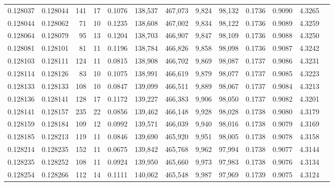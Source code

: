 \begin{tabular}{rrrrrrrrrrrrr}
0.128037 & 0.128044 &   141 &  17 &                                     0.1076 & 138,537 & 467,073 &   9,824 &  98,132 & 0.1736 & 0.9090 & 4.3265 \\
0.128044 & 0.128062 &    71 &  10 &                                     0.1235 & 138,608 & 467,002 &   9,834 &  98,122 & 0.1736 & 0.9089 & 4.3259 \\
0.128064 & 0.128079 &    95 &  13 &                                     0.1204 & 138,703 & 466,907 &   9,847 &  98,109 & 0.1736 & 0.9088 & 4.3250 \\
0.128081 & 0.128101 &    81 &  11 &                                     0.1196 & 138,784 & 466,826 &   9,858 &  98,098 & 0.1736 & 0.9087 & 4.3242 \\
0.128103 & 0.128111 &   124 &  11 &                                     0.0815 & 138,908 & 466,702 &   9,869 &  98,087 & 0.1737 & 0.9086 & 4.3231 \\
0.128114 & 0.128126 &    83 &  10 &                                     0.1075 & 138,991 & 466,619 &   9,879 &  98,077 & 0.1737 & 0.9085 & 4.3223 \\
0.128133 & 0.128133 &   108 &  10 &                                     0.0847 & 139,099 & 466,511 &   9,889 &  98,067 & 0.1737 & 0.9084 & 4.3213 \\
0.128136 & 0.128141 &   128 &  17 &                                     0.1172 & 139,227 & 466,383 &   9,906 &  98,050 & 0.1737 & 0.9082 & 4.3201 \\
0.128141 & 0.128157 &   235 &  22 &                                     0.0856 & 139,462 & 466,148 &   9,928 &  98,028 & 0.1738 & 0.9080 & 4.3179 \\
0.128159 & 0.128184 &   109 &  12 &                                     0.0992 & 139,571 & 466,039 &   9,940 &  98,016 & 0.1738 & 0.9079 & 4.3169 \\
0.128185 & 0.128213 &   119 &  11 &                                     0.0846 & 139,690 & 465,920 &   9,951 &  98,005 & 0.1738 & 0.9078 & 4.3158 \\
0.128214 & 0.128235 &   152 &  11 &                                     0.0675 & 139,842 & 465,768 &   9,962 &  97,994 & 0.1738 & 0.9077 & 4.3144 \\
0.128235 & 0.128252 &   108 &  11 &                                     0.0924 & 139,950 & 465,660 &   9,973 &  97,983 & 0.1738 & 0.9076 & 4.3134 \\
0.128254 & 0.128266 &   112 &  14 &                                     0.1111 & 140,062 & 465,548 &   9,987 &  97,969 & 0.1739 & 0.9075 & 4.3124 \\

\end{tabular}
